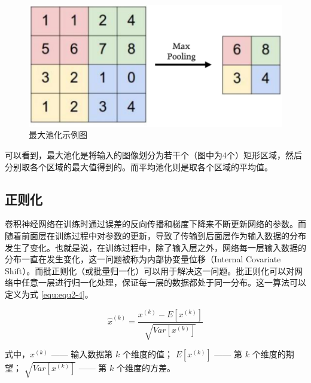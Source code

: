 \begin{figure}[!htbp]
	\centering
	\includegraphics{figures/6.png}
	\caption{最大池化示例图}
	\label{fig:fig2-5}
	\vspace{-0.8cm}  %
\end{figure}

\newpage
可以看到，最大池化是将输入的图像划分为若干个（图中为4个）矩形区域，然后分别取各个区域的最大值得到的。而平均池化则是取各个区域的平均值。

\subsection{正则化}

卷积神经网络在训练时通过误差的反向传播和梯度下降来不断更新网络的参数。而随着前面层在训练过程中对参数的更新，导致了传输到后面层作为输入数据的分布发生了变化。也就是说，在训练过程中，除了输入层之外，网络每一层输入数据的分布一直在发生变化，这一问题被称为内部协变量位移（Internal Covariate Shift）。而批正则化（或批量归一化）可以用于解决这一问题。批正则化可以对网络中任意一层进行归一化处理，保证每一层的数据都处于同一分布。这一算法可以定义为式 \ref{equ:equ2-4}。

\begin{equation}
	{\hat{x}}^{\left(k\right)}=\frac{x^{\left(k\right)}-E\left[x^{\left(k\right)}\right]}{\sqrt{Var\left[x^{\left(k\right)}\right]}}
	\label{equ:equ2-4}
\end{equation}

\noindent 式中，$x^{\left(k\right)}$ —— 输入数据第 $k$ 个维度的值；\newline
\indent\quad      $E\left[x^{\left(k\right)}\right]$ —— 第 $k$ 个维度的期望；\newline
\indent\quad       $\sqrt{Var\left[x^{\left(k\right)}\right]}$ —— 第 $k$ 个维度的方差。

